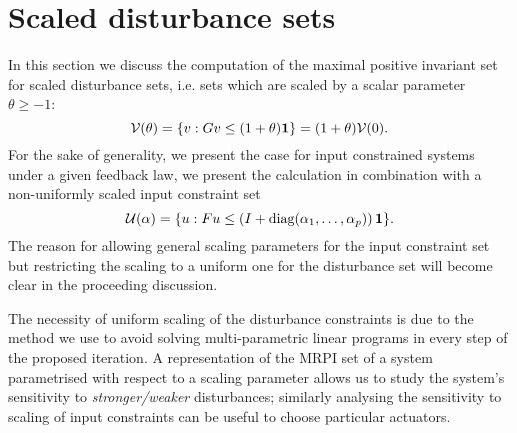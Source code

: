 %
%
%
\section{Scaled disturbance sets}\label{sec:scaled:disturbance:sets}
In this section we discuss the computation of the maximal positive invariant set for scaled disturbance
sets, i.e. sets which are scaled by a scalar parameter~$\theta\geq-1$:
%
\begin{equation}
\mathcal V(\theta) = \{v: Gv\leq(1+\theta){\bf{1}}\}
= (1+\theta)\mathcal V(0).
\end{equation}
%
For the sake of generality, we present the case for input constrained systems under a given feedback law,
we present the calculation in combination with a non-uniformly scaled input constraint set
%
\begin{equation}\label{eq:parametrised:input:constraints:non:uniform}
\mathcal U({\bf{\alpha}}) = \{u: Fu\leq\left(I+\text{diag}(\alpha_1,\dots,\alpha_p)\right){\bf{1}}\}.
\end{equation}
%
The reason for allowing general scaling parameters for the input constraint set but restricting the scaling
to a uniform one for the disturbance set will become clear in the proceeding discussion.

The necessity of uniform scaling of the disturbance constraints is due to the method we use to avoid
solving multi-parametric linear programs in every step of the proposed iteration.
%
A representation of the MRPI set of a system parametrised with respect to a scaling parameter allows us
to study the system's sensitivity to \emph{stronger/weaker} disturbances; similarly analysing the sensitivity to scaling of input 
constraints can be useful to choose particular actuators.

